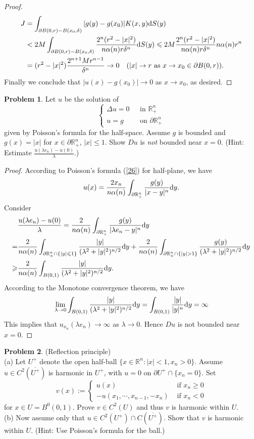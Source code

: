 \documentclass[hyperref,UTF8,12pt]{article}
\numberwithin{equation}{subsection}
\theoremstyle{plain}
\theoremstyle{definition}
\newtheorem{problem}{Problem}
\numberwithin{theorem}{section}
\numberwithin{lemma}{section}
\numberwithin{proposition}{section}
\numberwithin{remark}{section}
\numberwithin{corollary}{section}
\numberwithin{definition}{section}
\numberwithin{problem}{section}
\numberwithin{example}{section}
\def\dif{\textup{d}}
\newcommand{\ptl}{\partial}
\newcommand{\mr}{\mathbb{R}}
\renewcommand{\leq}{\leqslant}
\renewcommand{\geq}{\geqslant}
\begin{document}
\begin{proof}
\[\begin{aligned}
	J&=\int_{\ptl B(0,r)-B(x_0,\delta)}|g(y)-g(x_0)|K(x,y)\dif S(y)\\&<2M\int_{\ptl B(0,r)- B(x_0,\delta)}\frac{2^n(r^2-|x|^2)}{n\alpha(n)r\delta^n}\dif S(y)\leq2M \frac{2^n(r^2-|x|^2)}{n\alpha(n)r\delta^n}n\alpha(n)r^n\\
	&=(r^2-|x|^2)\frac{2^{n+1}Mr^{n-1}}{\delta^n}\to0\quad(|x|\to r\text{~as~}x\to x_0\in\ptl B(0,r)).\end{aligned}\]Finally we conclude that $|u(x)-g(x_0)|\to 0$ as $x\to x_0$, as desired.
\end{proof}
\begin{problem}
Let $u$ be the solution of\[\left\{\begin{aligned}
	\Delta u=0 &\text{~ in }\mr_+^n\\
	u=g &\text{~ on }\ptl\mr_+^n
\end{aligned}\right.\]
given by Poisson's formula for the half-space. Assume $g$ is bounded and $g(x)=|x|$ for $x \in \ptl\mr_{+}^n$, $|x|\leq1$. Show $Du$ is \textit{not} bounded near $x=0$. (Hint: Estimate $\frac{u(\lambda e_n)-u(0)}{\lambda}.$)
\end{problem}
\begin{proof}
According to Poisson's formula (\ref{26}) for half-plane, we have \[u(x)=\frac{2x_n}{n\alpha(n)}\int_{\ptl\mr_+^n}\frac{g(y)}{|x-y|^n}\dif y.\]Consider\[\begin{aligned}
	&\frac{u(\lambda e_n)-u(0)}{\lambda}=\frac{2}{n\alpha(n)}\int_{\ptl\mr_{+}^n} \frac{g(y)}{|\lambda e_n-y|^n}\dif y\\
	=&\frac{2}{n\alpha(n)}\int_{\ptl\mr_{+}^n\cap\{|y|\leq1\}} \frac{|y|}{(\lambda^2+|y|^2)^{n/2}}\dif y+\frac{2}{n\alpha(n)}\int_{\ptl \mr_{+}^n\cap\{|y|>1\}}\frac{g(y)}{(\lambda^2+|y|^2)^{n/2}}\dif y\\
	\geq&\frac{2}{n\alpha(n)}\int_{B(0,1)}\frac{|y|}{(\lambda^2+|y|^2)^{n/2}}\dif y.
\end{aligned}\]According to the Monotone convergence theorem, we have \[\lim_{\lambda\to0}\int_{B(0,1)}\frac{|y|}{(\lambda^2+|y|^2)^{n/2}}\dif y=\int_{B(0,1)}\frac{|y|}{|y|^n}\dif y=\infty\]This implies that $u_{x_n}(\lambda e_n)\to\infty$ as $\lambda\to0$. Hence $Du$ is not bounded near $x=0$.
\end{proof}
\begin{problem}
(Reflection principle)\\
(a) Let $U^+$ denote the open half-ball $\{x\in\mr^n:|x|<1,x_n>0\}$. Assume $u\in C^2(\overline{U^+})$ is harmonic in $U^+$, with $u=0$ on $\ptl U^+\cap\{x_n=0\}$. Set
\[v(x):=\begin{cases}u(x)& \text{ if } x_n\geq0\\-u(x_1,\cdots,x_{n-1},-x_n) & \text{ if } x_n<0\end{cases}\]
for $x\in U=B^0(0,1)$. Prove $v\in C^2(U)$ and thus $v$ is harmonic within $U$.\\
(b) Now assume only that $u\in C^2(U^+)\cap C(\overline{U^+})$. Show that $v$ is harmonic within $U$. (Hint: Use Poisson's formula for the ball.)
\end{problem}
\end{document}
